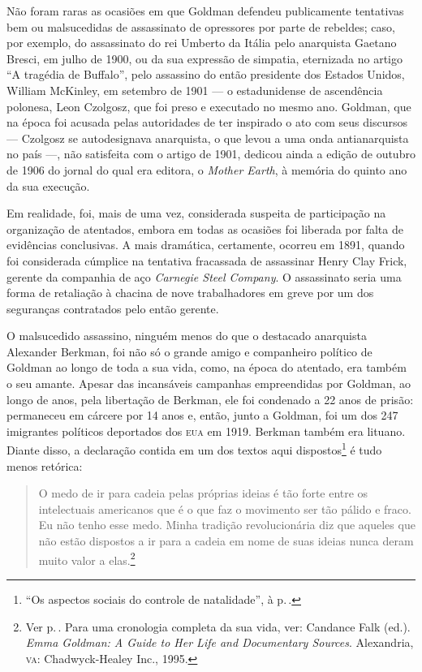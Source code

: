 Não foram raras
as ocasiões em que Goldman defendeu publicamente tentativas bem ou
malsucedidas de assassinato de opressores por parte de rebeldes; caso,
por exemplo, do assassinato do rei Umberto da Itália pelo anarquista
Gaetano Bresci, em julho de 1900, ou da sua expressão de simpatia,
eternizada no artigo ``A tragédia de Buffalo'', pelo assassino do então
presidente dos Estados Unidos, William McKinley, em setembro de 1901 ---
o estadunidense de ascendência polonesa, Leon Czolgosz, que foi preso e
executado no mesmo ano. Goldman, que na época foi acusada pelas
autoridades de ter inspirado o ato com seus discursos --- Czolgosz se
autodesignava anarquista, o que levou a uma onda antianarquista no país
---, não satisfeita com o artigo de 1901, dedicou ainda a edição de
outubro de 1906 do jornal do qual era editora, o \textit{Mother Earth}, à
memória do quinto ano da sua execução. 

Em realidade, foi, mais de uma
vez, considerada suspeita de participação na organização de atentados,
embora em todas as ocasiões foi liberada por falta de evidências
conclusivas. A mais dramática, certamente, ocorreu em 1891, quando foi
considerada cúmplice na tentativa fracassada de
assassinar Henry Clay Frick, gerente da companhia de aço
\textit{Carnegie Steel Company}. O assassinato seria uma forma de
retaliação à chacina de nove trabalhadores em greve por um dos
seguranças contratados pelo então gerente.

O malsucedido assassino,
ninguém menos do que o destacado anarquista Alexander Berkman, foi não
só o grande amigo e companheiro político de Goldman ao longo de toda a
sua vida, como, na época do atentado, era também o seu amante. Apesar
das incansáveis campanhas empreendidas por Goldman, ao longo de anos,
pela libertação de Berkman, ele foi condenado a 22 anos de
prisão: permaneceu em cárcere por 14 anos e, então,
junto a Goldman, foi um dos 247 imigrantes políticos deportados
dos \textsc{eua} em 1919. Berkman também era lituano. Diante disso, a declaração
contida em um dos textos aqui dispostos\footnote{``Os aspectos sociais do
controle de natalidade'', à p.\,\pageref{ref4}.} é tudo menos retórica:

\begin{quote}
O medo de ir para
cadeia pelas próprias ideias é tão forte entre os intelectuais
americanos que é o que faz o movimento ser tão pálido e fraco. Eu não
tenho esse medo. Minha tradição revolucionária diz que aqueles que não
estão dispostos a ir para a cadeia em nome de suas ideias nunca deram
muito valor a elas.\footnote{Ver p.\,\pageref{ref5}. Para uma cronologia completa da sua vida, ver: Candance Falk (ed.). \textit{Emma Goldman: A Guide to
  Her Life and Documentary Sources}. Alexandria, \textsc{va}: Chadwyck-Healey
  Inc., 1995.}
\end{quote}

